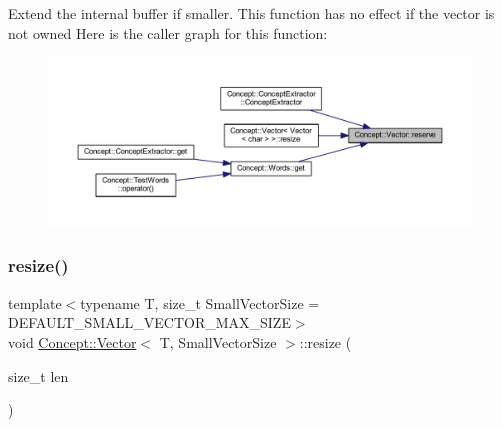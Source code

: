 Extend the internal buffer if smaller. This function has no effect if the vector is not owned Here is the caller graph for this function\+:\nopagebreak
\begin{figure}[H]
\begin{center}
\leavevmode
\includegraphics[width=350pt]{class_concept_1_1_vector_a5d08a1e6b61f98f85076646d06ba8640_icgraph}
\end{center}
\end{figure}
\mbox{\label{class_concept_1_1_vector_afc564010d47219272ccc41a7536aa13f}} 
\subsubsection{\texorpdfstring{resize()}{resize()}}
{\footnotesize\ttfamily template$<$typename T, size\+\_\+t Small\+Vector\+Size = D\+E\+F\+A\+U\+L\+T\+\_\+\+S\+M\+A\+L\+L\+\_\+\+V\+E\+C\+T\+O\+R\+\_\+\+M\+A\+X\+\_\+\+S\+I\+ZE$>$ \\
void \mbox{\hyperlink{class_concept_1_1_vector}{Concept\+::\+Vector}}$<$ T, Small\+Vector\+Size $>$\+::resize (\begin{DoxyParamCaption}\item[{size\+\_\+t}]{len }\end{DoxyParamCaption})\hspace{0.3cm}{\ttfamily [inline]}}


